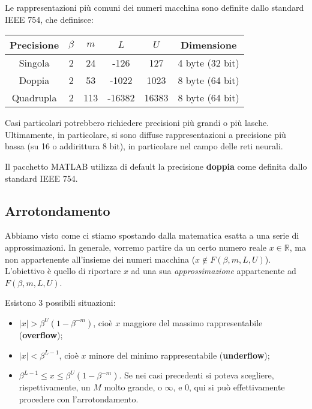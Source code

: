 \documentclass[a4paper,11pt]{article}
\begin{document}
Le rappresentazioni più comuni dei numeri macchina sono definite dallo standard IEEE 754, che definisce:

\begin{table}[h!]
	\center {}
	\begin{tabular} { c | c | c | c | c | c }
		\bfseries Precisione & \bfseries $\beta$ & \bfseries $m$ & \bfseries $L$ & \bfseries $U$ & \bfseries Dimensione \\ 
		\hline
		Singola & 2 & 24 & -126 & 127 & 4 byte (32 bit) \\ 
		Doppia & 2 & 53 & -1022 & 1023 & 8 byte (64 bit) \\ 
		Quadrupla & 2 & 113 & -16382 & 16383 & 8 byte (64 bit) \\ 
	\end{tabular}
\end{table}

Casi particolari potrebbero richiedere precisioni più grandi o più lasche.
Ultimamente, in particolare, si sono diffuse rappresentazioni a precisione più bassa (su 16 o addirittura 8 bit), in particolare nel campo delle reti neurali.

Il pacchetto MATLAB utilizza di default la precisione \textbf{doppia} come definita dallo standard IEEE 754.

\subsection{Arrotondamento}
Abbiamo visto come ci stiamo spostando dalla matematica esatta a una serie di approssimazioni.
In generale, vorremo partire da un certo numero reale $x \in \mathbb{R}$, ma non appartenente all'insieme dei numeri macchina ($x \not \in F(\beta, m, L ,U)$).
L'obiettivo è quello di riportare $x$ ad una sua \textit{approssimazione} appartenente ad $F(\beta, m, L, U)$.

Esistono 3 possibili situazioni:
\begin{itemize}
	\item $|x| > \beta^U (1 - \beta^{-m})$, cioè $x$ maggiore del massimo rappresentabile (\textbf{overflow});
	\item $|x| < \beta^{L - 1}$, cioè $x$ minore del minimo rappresentabile (\textbf{underflow});
	\item $\beta^{L - 1} \leq x \leq \beta^U (1 - \beta^{-m})$. Se nei casi precedenti si poteva scegliere, rispettivamente, un $M$ molto grande, o  $\infty$, e $0$, qui si può effettivamente procedere con l'arrotondamento.
\end{itemize}
\end{document}
